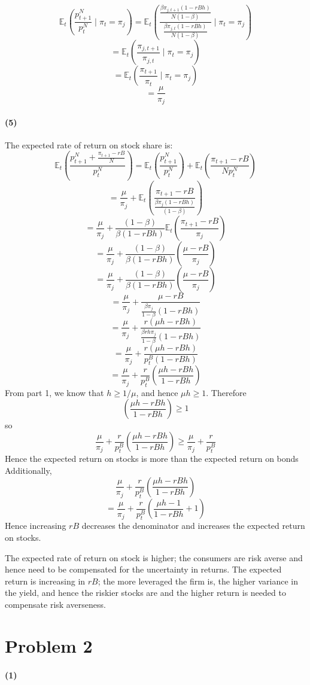 \documentclass[10pt,letter]{article}
\newcommand{\problem}[1]{\section*{Problem #1}}
\newcommand{\problempart}[1]{\paragraph{#1}}
\begin{document}
\[ \mathbb{E}_t \left( \frac{p^N_{t+1}}{p^N_t} \mid \pi_t = \pi_j \right) = \mathbb{E}_t \left( \frac{\frac{\beta \pi_{j,t+1}(1-rBh)}{N(1-\beta)}}{\frac{\beta \pi_{j,t}(1-rBh)}{N(1-\beta)}} \mid \pi_t = \pi_j \right)  \]
\[ =  \mathbb{E}_t \left( \frac{\pi_{j,t+1}}{\pi_{j,t}} \mid \pi_t = \pi_j \right) \]
\[ =  \mathbb{E}_t \left( \frac{\pi_{t+1}}{\pi_{t}} \mid \pi_t = \pi_j \right) \]
\[ =  \frac{\mu}{\pi_j} \]
\problempart{(5)}
The expected rate of return on stock share is:
\[ \mathbb{E}_t \left(\frac{p^N_{t+1} + \frac{\pi_{t+1} - rB}{N}}{p^N_t} \right) = \mathbb{E}_t\left(\frac{p^N_{t+1} }{p^N_t}\right) + \mathbb{E}_t \left( \frac{\pi_{t+1} - rB}{N p^N_t} \right) \]
\[ = \frac{\mu}{\pi_j} + \mathbb{E}_t \left( \frac{\pi_{t+1} - rB}{\frac{\beta \pi_{j}(1-rBh)}{(1-\beta)}} \right)  \]
\[ = \frac{\mu}{\pi_j} + \frac{(1-\beta)}{\beta(1-rBh)}\mathbb{E}_t \left( \frac{\pi_{t+1} - rB}{\pi_{j}} \right)  \]
\[ = \frac{\mu}{\pi_j} + \frac{(1-\beta)}{\beta(1-rBh)}\left( \frac{\mu - rB}{\pi_{j}} \right)  \]
\[ = \frac{\mu}{\pi_j} + \frac{(1-\beta)}{\beta(1-rBh)}\left( \frac{\mu - rB}{\pi_{j}} \right)  \]
\[ = \frac{\mu}{\pi_j} + \frac{\mu - rB}{\frac{\beta \pi_j}{1-\beta}(1-rBh)} \]
\[ = \frac{\mu}{\pi_j} + \frac{r (\mu h - r B h)}{\frac{\beta r h \pi_j}{1-\beta}(1-rBh)} \]
\[ = \frac{\mu}{\pi_j} + \frac{r (\mu h - r B h)}{p^B_{t}(1-rBh)} \]
\[ = \frac{\mu}{\pi_j} + \frac{r}{p^B_t}\left( \frac{ \mu h - r B h}{1-rBh} \right) \]
From part 1, we know that $h \ge 1/\mu$, and hence $\mu h \ge 1$. Therefore
\[\left( \frac{ \mu h - r B h}{1-rBh} \right) \ge 1 \]
so
\[ \frac{\mu}{\pi_j} + \frac{r}{p^B_t}\left( \frac{ \mu h - r B h}{1-rBh} \right)\ge  \frac{\mu}{\pi_j} + \frac{r}{p^B_t}\]
Hence the expected return on stocks is more than the expected return on bonds
Additionally,
\[ \frac{\mu}{\pi_j} + \frac{r}{p^B_t}\left( \frac{ \mu h - r B h}{1-rBh} \right) \]
\[ = \frac{\mu}{\pi_j} + \frac{r}{p^B_t}\left( \frac{ \mu h - 1}{1-rBh} + 1 \right) \]
Hence increasing $rB$ decreases the denominator and increases the expected return on stocks.

The expected rate of return on stock is higher; the consumers are risk averse and hence need to be compensated for the uncertainty in returns. The expected return is increasing in $rB$; the more leveraged the firm is, the higher variance in the yield, and hence the riskier stocks are and the higher return is needed to compensate risk averseness.

\problem{2}
\problempart{(1)}
\end{document}
